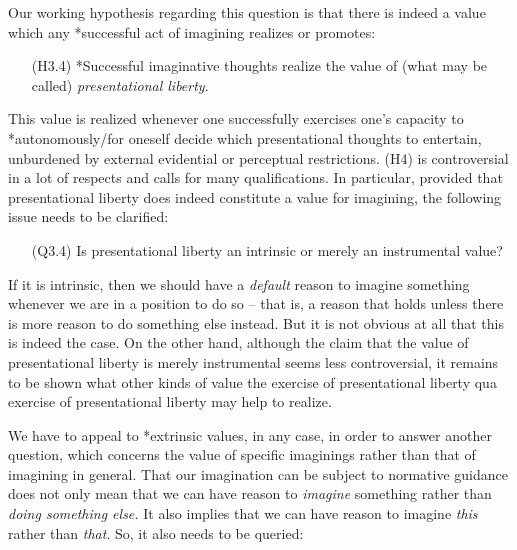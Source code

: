 \noindent Our working hypothesis regarding this question is that there is indeed a value which any *successful act of imagining realizes or promotes:

\vspace{-.1cm}
\begin{itemize}[leftmargin=2cm]
\item[(H3.4)] *Successful imaginative thoughts realize the value of (what may be called) \emph{presentational liberty}.
\end{itemize}
\vspace{-.1cm}

\noindent This value is realized whenever one successfully exercises one's capacity to *autonomously/for oneself decide which presentational thoughts to entertain, unburdened by external evidential or perceptual restrictions. (H4) is controversial in a lot of respects and calls for many qualifications. In particular, provided that presentational liberty does indeed constitute a value for imagining, the following issue needs to be clarified:

\vspace{-.1cm}
\begin{itemize}[leftmargin=2cm]
\item[(Q3.4)] Is presentational liberty an intrinsic or merely an instrumental value?
\end{itemize}
\vspace{-.1cm}

\noindent If it is intrinsic, then we should have a \emph{default} reason to imagine something whenever we are in a position to do so -- that is, a reason that holds unless there is more reason to do something else instead. But it is not obvious at all that this is indeed the case. On the other hand, although the claim that the value of presentational liberty is merely instrumental seems less controversial, it remains to be shown what other kinds of value the exercise of presentational liberty qua exercise of presentational liberty may help to realize.

We have to appeal to *extrinsic values, in any case, in order to answer another question, which concerns the value of specific imaginings rather than that of imagining in general. That our imagination can be subject to normative guidance does not only mean that we can have reason to \emph{imagine} something rather than \emph{doing something else.} It also implies that we can have reason to imagine \emph{this} rather than \emph{that}. So, it also needs to be queried:

